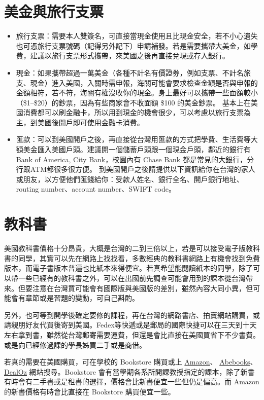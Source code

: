 \documentclass[10pt,a4paper]{book}
\begin{document}
\begin{CJK}{UTF8}{bkai}
\section{美金與旅行支票}
\begin{itemize}
\item 旅行支票：需要本人雙簽名，可直接當現金使用且比現金安全，若不小心遺失也可憑旅行支票號碼（記得另外記下）申請補發。若是需要攜帶大美金，如學費，建議以旅行支票形式攜帶，來美國之後再直接兌現或存入銀行。
\item 現金：如果攜帶超過一萬美金（各種不計名有價證券，例如支票、不計名旅支、現金）進入美國，入關時需申報，海關可能會要求檢查金額是否與申報的金額相符，若不符，海關有權沒收你的現金。身上最好可以攜帶一些面額較小（\$1--\$20）的鈔票，因為有些商家會不收面額 \$100 的美金鈔票。
基本上在美國消費都可以刷金融卡，所以用到現金的機會很少，可以考慮以旅行支票為主，到美國後開戶即可使用金融卡消費。
\item 匯款：可以到美國開戶之後，再直接從台灣用匯款的方式把學費、生活費等大額美金匯入美國戶頭。建議開一個儲蓄戶頭跟一個現金戶頭，鄰近的銀行有Bank of America, City Bank，校園內有 Chase Bank 都是常見的大銀行，分行跟ATM都很多很方便。
到美國開戶之後請提供以下資訊給你在台灣的家人或朋友，以方便他們匯錢給你：受款人姓名、銀行全名、開戶銀行地址、routing number、account number、SWIFT code。
\end{itemize}

\section{教科書}
美國教科書價格十分昂貴，大概是台灣的二到三倍以上，若是可以接受電子版教科書的同學，其實可以先在網路上找找看，多數經典的教科書網路上有機會找到免費版本，而電子書版本普遍也比紙本來得便宜。若真希望能閱讀紙本的同學，除了可以帶一些已經有的教科書之外，可以在出國前先調查可能會用到的課本從台灣帶來。但要注意在台灣買可能會有國際版與美國版的差別，雖然內容大同小異，但可能會有章節或是習題的變動，可自己斟酌。

另外，也可等到開學後確定要修的課程，再在台灣的網路書店、拍賣網站購買，或請親朋好友代買後寄到美國。Fedex等快遞或是郵局的國際快捷可以在三天到十天左右拿到書，雖然從台灣郵寄需要運費，但還是會比直接在美國買省下不少書費。或是向已經修過課的學長姊買二手或是商借。

若真的需要在美國購買，可在學校的 Bookstore 購買或上 \href{http://www.amazon.com/}{Amazon}、 \href{http://www.abebooks.com/}{Abebooks}、\href{http://www.dealoz.com/}{DealOz} 網站搜尋。Bookstore 會有當學期各系所開課教授指定的課本，除了新書有時會有二手書或是租書的選擇，價格會比新書便宜一些但仍是偏高。而 Amazon 的新書價格有時會比直接在 Bookstore 購買便宜一些。


\end{CJK}
\end{document}
